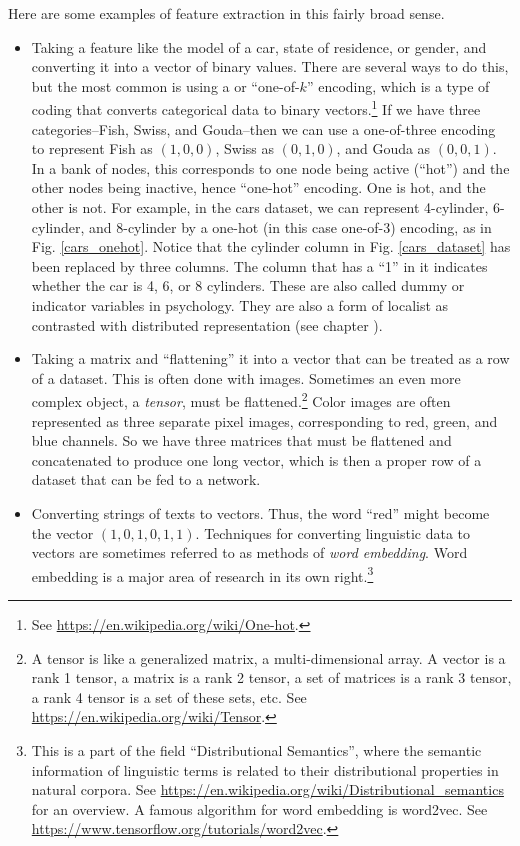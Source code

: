 Here are some examples of feature extraction in this fairly broad sense. 
\begin{itemize}
\item Taking a feature like the model of a car, state of residence, or gender, and converting it into a vector of binary values. There are several ways to do this, but the most common is using a  or ``one-of-$k$'' encoding, which is a type of coding that converts categorical data to binary vectors.\footnote{See \url{https://en.wikipedia.org/wiki/One-hot}.} If we have three categories--Fish, Swiss, and Gouda--then we can use a one-of-three encoding to represent Fish as $(1,0,0)$, Swiss as $(0,1,0)$, and Gouda as $(0,0,1)$. In a bank of nodes, this corresponds to one node being active (``hot'') and the other nodes being inactive, hence ``one-hot'' encoding. One is hot, and the other is not. For example, in the cars dataset, we can represent 4-cylinder, 6-cylinder, and 8-cylinder by a one-hot (in this case one-of-3) encoding, as in Fig. \ref{cars_onehot}. Notice that the cylinder column in Fig. \ref{cars_dataset} has been  replaced by three columns. The column that has a ``1'' in it indicates whether the car is 4, 6, or 8 cylinders. These are also called dummy or indicator variables in psychology. They are also a form of localist as contrasted with distributed representation (see chapter ).
\item Taking a matrix and ``flattening'' it into a vector that can be treated as a row of a dataset. This is often done with images. Sometimes an even more complex object, a \emph{tensor}, must be flattened.\footnote{A tensor is like a generalized matrix, a multi-dimensional array. A vector is a rank 1 tensor, a matrix is a rank 2 tensor, a set of matrices is a rank 3 tensor, a rank 4 tensor is a set of these sets, etc. See \url{https://en.wikipedia.org/wiki/Tensor}.}  Color images are often represented as three separate pixel  images, corresponding to red, green, and blue channels. So we have three matrices that must be flattened and concatenated to produce one long vector, which is then a proper row of a dataset that can be fed to a network.
\item Converting strings of texts to vectors. Thus, the word ``red'' might become the vector $(1,0,1,0,1,1)$. Techniques for converting linguistic data to vectors are sometimes referred to as methods of \emph{word embedding}. Word embedding is a major area of research in its own right.\footnote{This is a part of the field ``Distributional Semantics'', where the semantic information of linguistic terms is related to their distributional properties in natural corpora. See \url{https://en.wikipedia.org/wiki/Distributional_semantics} for an overview. A famous algorithm for word embedding is word2vec. See \url{https://www.tensorflow.org/tutorials/word2vec}.} %

\end{itemize}
